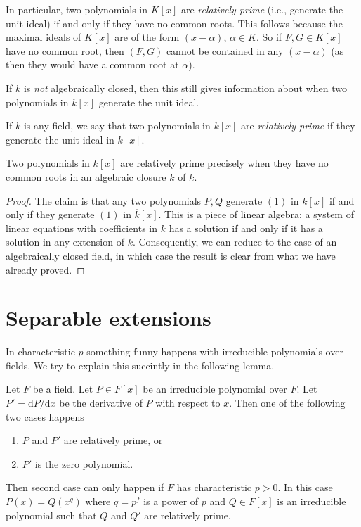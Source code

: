 \medskip\noindent
In particular, two polynomials in $K[x]$ are {\it relatively prime}
(i.e., generate the unit ideal) if and only if they have no common roots.
This follows because the maximal ideals of $K[x]$ are of the form
$(x - \alpha)$, $\alpha \in K$. So if $F, G \in K[x]$ have no common root,
then $(F, G)$ cannot be contained in any $(x - \alpha)$ (as then they would
have a common root at $\alpha$).

\medskip\noindent
If $k$ is {\it not} algebraically closed, then this still gives
information about when two polynomials in $k[x]$ generate the unit ideal.

\begin{definition}
\label{definition-relatively-prime}
If $k$ is any field, we say that two polynomials in $k[x]$ are
{\it relatively prime} if they generate the unit ideal in $k[x]$.
\end{definition}

\begin{lemma}
\label{lemma-relatively-prime-polynomials}
Two polynomials in $k[x]$ are relatively prime precisely when they
have no common roots in an algebraic closure $\overline{k}$ of $k$.
\end{lemma}

\begin{proof}
The claim is that any two polynomials $P, Q$ generate $(1)$ in $k[x]$ if and
only if they generate $(1)$ in $\overline{k}[x]$. This is a piece of
linear algebra: a system of linear equations with coefficients in $k$ has
a solution if and only if it has a solution in any extension of $k$.
Consequently, we can reduce to the case of an algebraically closed field, in
which case the result is clear from what we have already proved.
\end{proof}





\section{Separable extensions}
\label{section-separable-extensions}

\noindent
In characteristic $p$ something funny happens with irreducible polynomials
over fields. We try to explain this succintly in the following lemma.

\begin{lemma}
\label{lemma-irreducible-polynomials}
Let $F$ be a field. Let $P \in F[x]$ be an irreducible polynomial over $F$.
Let $P' = \text{d}P/\text{d}x$ be the derivative of $P$ with respect
to $x$. Then one of the following two cases happens
\begin{enumerate}
\item $P$ and $P'$ are relatively prime, or
\item $P'$ is the zero polynomial.
\end{enumerate}
Then second case can only happen if $F$ has characteristic $p > 0$.
In this case $P(x) = Q(x^q)$ where $q = p^f$ is a power of $p$ and
$Q \in F[x]$ is an irreducible polynomial such that $Q$ and $Q'$
are relatively prime.
\end{lemma}

